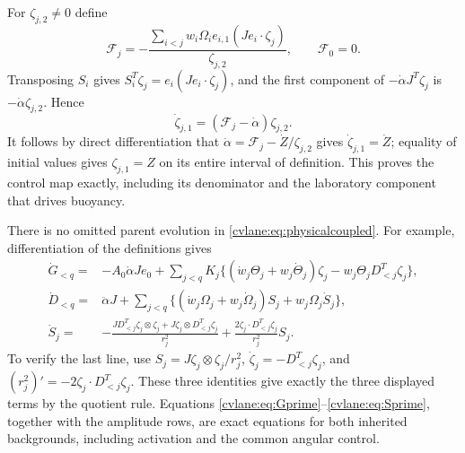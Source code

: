 For $\zeta_{j,2}\ne0$ define
\begin{equation}
 \mathcal F_j=-\frac{\sum_{i<j}w_i\Omega_i e_{i,1}
 (Je_i\cdot\zeta_j)}{\zeta_{j,2}},\qquad \mathcal F_0=0.
 \label{cvlane:eq:physicalfeedback}
\end{equation}
Transposing $S_i$ gives
$S_i^T\zeta_j=e_i(Je_i\cdot\zeta_j)$, and the first
component of $-\dot\alpha J^T\zeta_j$ is
$-\dot\alpha\zeta_{j,2}$. Hence
\begin{equation}
 \dot\zeta_{j,1}=(\mathcal F_j-\dot\alpha)\zeta_{j,2}.
 \label{cvlane:eq:controlledcomponent}
\end{equation}
It follows by direct differentiation that
$\dot\alpha=\mathcal F_j-\dot Z/\zeta_{j,2}$ gives
$\dot\zeta_{j,1}=\dot Z$; equality of initial values gives
$\zeta_{j,1}=Z$ on its entire interval of definition.
This proves the control map exactly, including its denominator
and the laboratory component that drives buoyancy.

There is no omitted parent evolution in \eqref{cvlane:eq:physicalcoupled}.
For example, differentiation of the definitions gives
\begin{align}
 \dot G_{<q}={}&-A_0\dot\alpha Je_0+
 \sum_{j<q}K_j\{(\dot w_j\Theta_j+w_j\dot\Theta_j)\zeta_j
 -w_j\Theta_jD_{<j}^T\zeta_j\},\label{cvlane:eq:Gprime}\\
 \dot D_{<q}={}&\ddot\alpha J+
 \sum_{j<q}\{(\dot w_j\Omega_j+w_j\dot\Omega_j)S_j
 +w_j\Omega_j\dot S_j\},\label{cvlane:eq:Dprime}\\
 \dot S_j={}&-\frac{JD_{<j}^T\zeta_j\otimes\zeta_j
 +J\zeta_j\otimes D_{<j}^T\zeta_j}{r_j^2}
 +\frac{2\zeta_j\cdot D_{<j}^T\zeta_j}{r_j^2}S_j.
 \label{cvlane:eq:Sprime}
\end{align}
To verify the last line, use $S_j=J\zeta_j\otimes\zeta_j/r_j^2$,
$\dot\zeta_j=-D_{<j}^T\zeta_j$, and
$(r_j^2)'=-2\zeta_j\cdot D_{<j}^T\zeta_j$. These three
identities give exactly the three displayed terms by the quotient
rule. Equations \eqref{cvlane:eq:Gprime}--\eqref{cvlane:eq:Sprime}, together
with the amplitude rows, are exact equations for both inherited
backgrounds, including activation and the common angular control.

